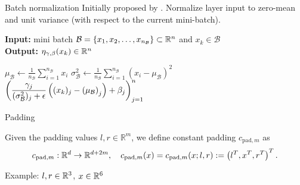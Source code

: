 \begin{frame}[c]{Batch normalization}
    Initially proposed by \textcite{batchnorm-ioffe15}.
     Normalize layer input 
    to zero-mean and unit variance (with respect to the current mini-batch).
  
    \begin{algorithm}[H]
      \caption{Batch normalization transform $\eta_{\gamma, \beta}$}
      \textbf{Input:} mini batch $\mathcal{B} = \{x_1, x_2, \dots, x_{n_\mathcal{B}}\} \subset \mathbb{R}^n$ 
      and $x_k \in \mathcal{B}$ \\
      \textbf{Output:} $\eta_{\gamma, \beta}(x_k) \in \mathbb{R}^n$
      \begin{algorithmic}
         
          \State $\displaystyle
          \mu_\mathcal{B} \gets \frac{1}{n_\mathcal{B}} \sum_{i=1}^{n_\mathcal{B}} x_i$
          \State $\displaystyle
          \sigma^2_\mathcal{B} \gets \frac{1}{n_\mathcal{B}} \sum_{i=1}^{n_\mathcal{B}} 
          (x_i - \mu_\mathcal{B})^2$
        \EndIf
        \State \Return 
        $\displaystyle \left( \frac{\gamma_j}{(\sigma^2_\mathcal{B})_j + \epsilon} 
        \left( (x_k)_j - \left( \mu_\mathcal{B} \right)_j \right) + \beta_j \right)_{j=1}^n$
      \end{algorithmic}
    \end{algorithm}
\end{frame}

\begin{frame}{Padding}
    \begin{definition}
        Given the padding values $l,r \in \mathbb{R}^m$, we define constant padding 
        $c_{\text{pad},m}$ as
        \begin{equation*}
        c_{\text{pad},m} : \mathbb{R}^d \to \mathbb{R}^{d+2m},
        \quad c_{\text{pad},m}(x) = c_{\text{pad},m}(x;l,r) := \left( l^T, x^T, r^T \right)^T
        .
        \end{equation*}
    \end{definition}

    \vspace{0.3cm}
    Example:
    $l,r \in \mathbb{R}^3$,
    $x \in \mathbb{R}^6$

    \vspace{0.3cm}
    \centering
\end{frame}

